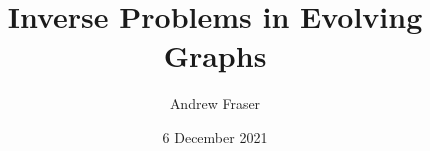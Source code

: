 \documentclass{beamer}
\title{Inverse Problems in Evolving Graphs}
\author{Andrew Fraser}
\date{6 December 2021}
\begin{document}
	\begin{frame}
		\titlepage
	\end{frame}

	
	
	
\end{document}
